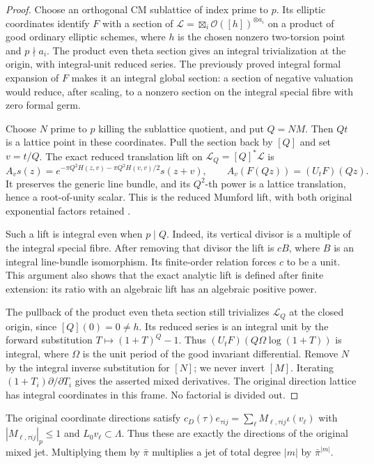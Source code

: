 \begin{proof}
Choose an orthogonal CM sublattice of index prime to $p$.
Its elliptic coordinates identify $F$ with a section of
$\mathscr L=\boxtimes_i\mathcal O([h])^{\otimes a_i}$ on a
product of good ordinary elliptic schemes, where $h$ is the
chosen nonzero two-torsion point and $p\nmid a_i$.
The product even theta section gives an integral trivialization
at the origin, with integral-unit reduced series.
The previously proved integral formal expansion of $F$ makes
it an integral global section: a section of negative valuation
would reduce, after scaling, to a nonzero section on the integral
special fibre with zero formal germ.

Choose $N$ prime to $p$ killing the sublattice quotient, and
put $Q=NM$. Then $Qt$ is a lattice point in these coordinates.
Pull the section back by $[Q]$ and set $v=t/Q$.
The exact reduced translation lift on
$\mathscr L_Q=[Q]^*\mathscr L$ is
\[
 A_vs(z)=
 e^{-\pi Q^2H(z,v)-\pi Q^2H(v,v)/2}s(z+v),
 \qquad A_v(F(Qz))=(U_tF)(Qz).
\]
It preserves the generic line bundle, and its $Q^2$-th power
is a lattice translation, hence a root-of-unity scalar.
This is the reduced Mumford lift, with both original
exponential factors retained
\cite[Lemma~2.7 and Proposition~2.8]{bannai-kobayashi-2007}.

Such a lift is integral even when $p\mid Q$. Indeed, its
vertical divisor is a multiple of the integral special fibre.
After removing that divisor the lift is $cB$, where $B$ is an
integral line-bundle isomorphism. Its finite-order relation
forces $c$ to be a unit. This argument also shows that the
exact analytic lift is defined after finite extension: its
ratio with an algebraic lift has an algebraic positive power.

The pullback of the product even theta section still
trivializes $\mathscr L_Q$ at the closed origin, since
$[Q](0)=0\ne h$. Its reduced series is an integral unit by
the forward substitution $T\mapsto(1+T)^Q-1$.
Thus $(U_tF)(Q\Omega\log(1+T))$ is integral, where
$\Omega$ is the unit period of the good invariant differential.
Remove $N$ by the integral inverse substitution for $[N]$;
we never invert $[M]$. Iterating
$(1+T_i)\partial/\partial T_i$ gives the asserted mixed
derivatives. The original direction lattice has integral
coordinates in this frame. No factorial is divided out.
\end{proof}

The original coordinate directions satisfy
$c_D(\tau)e_{\tau ij}=\sum_\ell M_{\ell,\tau ij}\iota(v_\ell)$
with $|M_{\ell,\tau ij}|_p\le1$ and $L_0v_\ell\subset\Lambda$.
Thus these are exactly the directions of the original mixed
jet. Multiplying them by $\bar\pi$ multiplies a jet of total
degree $|m|$ by $\bar\pi^{|m|}$.

